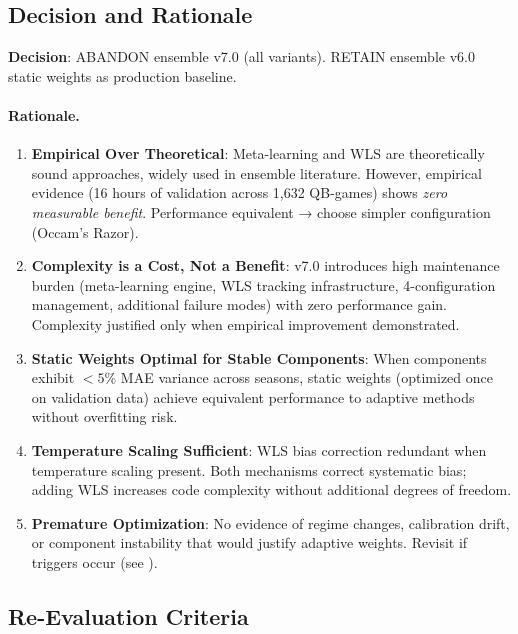 \subsection{Decision and Rationale}

\textbf{Decision}: ABANDON ensemble v7.0 (all variants). RETAIN ensemble v6.0 static weights as production baseline.

\paragraph{Rationale.}

\begin{enumerate}
  \item \textbf{Empirical Over Theoretical}: Meta-learning and WLS are theoretically sound approaches, widely used in ensemble literature. However, empirical evidence (16 hours of validation across 1,632 QB-games) shows \textit{zero measurable benefit}. Performance equivalent → choose simpler configuration (Occam's Razor).

  \item \textbf{Complexity is a Cost, Not a Benefit}: v7.0 introduces high maintenance burden (meta-learning engine, WLS tracking infrastructure, 4-configuration management, additional failure modes) with zero performance gain. Complexity justified only when empirical improvement demonstrated.

  \item \textbf{Static Weights Optimal for Stable Components}: When components exhibit $<5\%$ MAE variance across seasons, static weights (optimized once on validation data) achieve equivalent performance to adaptive methods without overfitting risk.

  \item \textbf{Temperature Scaling Sufficient}: WLS bias correction redundant when temperature scaling present. Both mechanisms correct systematic bias; adding WLS increases code complexity without additional degrees of freedom.

  \item \textbf{Premature Optimization}: No evidence of regime changes, calibration drift, or component instability that would justify adaptive weights. Revisit if triggers occur (see ).
\end{enumerate}

\subsection{Re-Evaluation Criteria}
\label{sec:v7-reevaluation-criteria}

